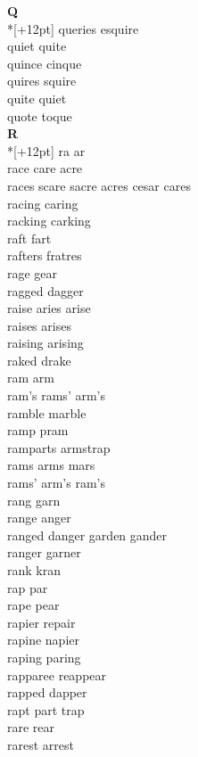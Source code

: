 \vspace{14pt}
\noindent\textbf{\Large Q}\\*[+12pt]
queries esquire\\
quiet quite\\
quince cinque\\
quires squire\\
quite quiet\\
quote toque\\

\vspace{14pt}
\noindent\textbf{\Large R}\\*[+12pt]
ra ar\\
race care acre\\
races scare sacre acres cesar cares\\
racing caring\\
racking carking\\
raft fart\\
rafters fratres\\
rage gear\\
ragged dagger\\
raise aries arise\\
raises arises\\
raising arising\\
raked drake\\
ram arm\\
ram's rams' arm's\\
ramble marble\\
ramp pram\\
ramparts armstrap\\
rams arms mars\\
rams' arm's ram's\\
rang garn\\
range anger\\
ranged danger garden gander\\
ranger garner\\
rank kran\\
rap par\\
rape pear\\
rapier repair\\
rapine napier\\
raping paring\\
rapparee reappear\\
rapped dapper\\
rapt part trap\\
rare rear\\
rarest arrest\\
